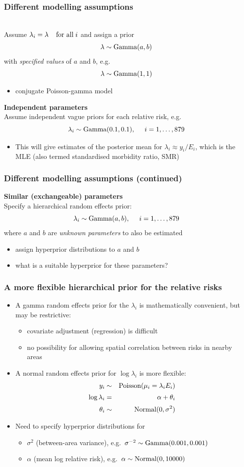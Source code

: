 \documentclass{beamer}
\newcommand{\bi}{\begin{itemize}}
\newcommand{\ei}{\end{itemize}}
\newcommand{\I}{\item}
\newcommand{\nestedbi}{\begin{itemize}}
\newcommand{\nestedei}{\end{itemize}}
\newcommand{\bibig}{\begin{itemize}}
\newcommand{\eibig}{\end{itemize}}
\newcommand{\beqs}{\begin{eqnarray*}}
\newcommand{\eeqs}{\end{eqnarray*}}
\newcommand{\sis}{{\sigma^2}}
\begin{document}
\begin{frame}
\frametitle{Different modelling assumptions}
\vspace{2mm}{\bf Identical parameters}\\\vspace{2mm}
Assume $\lambda_i = \lambda \;\;\;\; \hbox{for all}\; i$ and assign a prior
   $$ \lambda \sim \hbox{Gamma}(a, b)$$
   with \alert{\it {specified values}} of $a$ and $b$, e.g.
      $$ \lambda \sim \hbox{Gamma}(1, 1)$$
      \vspace{-6mm}
   \bi
   \I[$\rightarrow$] conjugate Poisson-gamma model
   \ei
\vspace{3mm}
{\bf Independent parameters}\\\vspace{2mm}
Assume independent vague priors for each relative risk, e.g.
   $$\lambda_i \sim \hbox{Gamma}(0.1, 0.1), \;\;\;\;\; i=1,\ldots,879$$
\bi
      \vspace{-6mm}
\I[$\rightarrow$] This will give estimates of the posterior mean for $\lambda_i  \approx
y_i/E_i$, which is the MLE (also termed standardised morbidity ratio, SMR)
\ei
\end{frame}

\begin{frame}
\frametitle{Different modelling assumptions (continued)}
{\bf Similar (exchangeable) parameters}\\ \vspace{2mm}
Specify a \alert{hierarchical} random effects prior:
   $$\lambda_i \sim \hbox{Gamma}(a, b), \;\;\;\;\; i=1,\ldots,879$$
   where $a$ and $b$ are \alert{{\it unknown parameters}} to also be \alert{estimated}\vspace{2mm}
   \bi
\I[$\rightarrow$] assign hyperprior distributions to $a$ and $b$\vspace{2mm}
\I[$\rightarrow$] what is a suitable hyperprior for these parameters?
\ei
\end{frame}

\begin{frame}
\frametitle{A more flexible hierarchical prior for the relative risks}
\bibig
\I A gamma random effects prior for the $\lambda_i$ is mathematically convenient,
but may be restrictive:\vspace{1mm}
  \nestedbi
  \I covariate adjustment (regression) is difficult\vspace{1mm}
  \I no possibility for allowing spatial correlation between
     risks in nearby areas\vspace{2mm}
  \nestedei
\I A normal random effects prior for $\log \lambda_i$ is more flexible:
\beqs
y_i & \sim & \hbox{Poisson}(\mu_i= \lambda_i E_i ) \\[2pt]
\log \lambda_i & = & \alpha + \theta_i \\[2pt]
\theta_i & \sim & \hbox{Normal}(0, \sis)
\eeqs
\I Need to specify hyperprior distributions for\vspace{1mm}
     \nestedbi
     \I[] $\sis$ (between-area variance), e.g.~$\sigma^{-2} \sim \hbox{Gamma}(0.001, 0.001)$ \vspace{1mm}
     \I[] $\alpha$ (mean log relative risk), e.g.~$\alpha \sim \hbox{Normal}(0, 10000)$
     \nestedei
\eibig
\end{frame}
\end{document}
